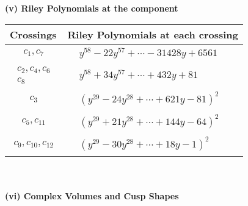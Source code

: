\documentclass[1p]{elsarticle_modified}
\theoremstyle{definition}
\begin{document}
\newpage\renewcommand{\arraystretch}{1}
\flushleft \textbf{(v) Riley Polynomials at the component}\newline \\
\begin{tabular}{m{50pt}|m{274pt}}
Crossings & \hspace{64pt}Riley Polynomials at each crossing \\
\hline $$\begin{aligned}c_{1},c_{7}\end{aligned}$$&$\begin{aligned}
&y^{58}-22 y^{57}+\cdots-31428 y+6561
\end{aligned}$\\
\hline $$\begin{aligned}c_{2},c_{4},c_{6}\\c_{8}\end{aligned}$$&$\begin{aligned}
&y^{58}+34 y^{57}+\cdots+432 y+81
\end{aligned}$\\
\hline $$\begin{aligned}c_{3}\end{aligned}$$&$\begin{aligned}
&(y^{29}-24 y^{28}+\cdots+621 y-81)^{2}
\end{aligned}$\\
\hline $$\begin{aligned}c_{5},c_{11}\end{aligned}$$&$\begin{aligned}
&(y^{29}+21 y^{28}+\cdots+144 y-64)^{2}
\end{aligned}$\\
\hline $$\begin{aligned}c_{9},c_{10},c_{12}\end{aligned}$$&$\begin{aligned}
&(y^{29}-30 y^{28}+\cdots+18 y-1)^{2}
\end{aligned}$\\
\hline
\end{tabular}\\~\\
\newpage\flushleft \textbf{(vi) Complex Volumes and Cusp Shapes}
\end{document}
